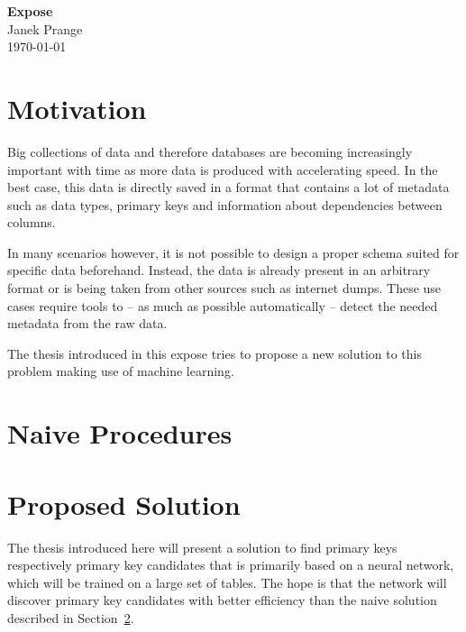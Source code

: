 \documentclass[a4paper]{article}
\begin{document}
\thispagestyle{firstpagestyle}
\begin{center}
  \huge \textbf{Expose}\\[8pt]
  \normalsize Janek Prange\\
  \today
\end{center}

\section{Motivation}
Big collections of data and therefore databases are becoming increasingly important with time as more data is produced with accelerating speed. In the best case, this data is directly saved in a format that contains a lot of metadata such as data types, primary keys and information about dependencies between columns.

In many scenarios however, it is not possible to design a proper schema suited for specific data beforehand. Instead, the data is already present in an arbitrary format or is being taken from other sources such as internet dumps. These use cases require tools to -- as much as possible automatically -- detect the needed metadata from the raw data. %

The thesis introduced in this expose tries to propose a new solution to this problem making use of machine learning.


\section{Naive Procedures}\label{sec:naiveProcedures}

\section{Proposed Solution}\label{sec:proposedSolution}
The thesis introduced here will present a solution to find primary keys respectively primary key candidates that is primarily based on a neural network, which will be trained on a large set of tables. The hope is that the network will discover primary key candidates with better efficiency than the naive solution described in Section~\ref{sec:naiveProcedures}.
\end{document}
